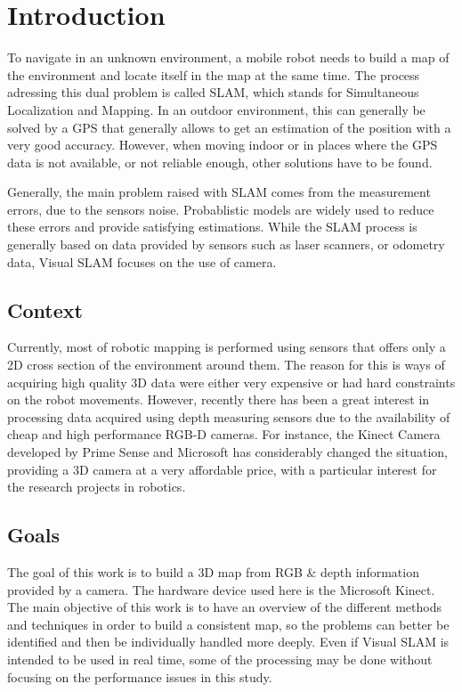 \chapter{Introduction}

To navigate in an unknown environment, a mobile robot needs to build a map of the environment and locate itself in the map at the same time. The process adressing this dual problem is called SLAM, which stands for Simultaneous Localization and Mapping. In an outdoor environment, this can generally be solved by a GPS that generally allows to get an estimation of the position with a very good accuracy. However, when moving indoor or in places where the GPS data is not available, or not reliable enough, other solutions have to be found. 

Generally, the main problem raised with SLAM comes from the measurement errors, due to the sensors noise. Probablistic models are widely used to reduce these errors and provide satisfying estimations. While the SLAM process is generally based on data provided by sensors such as laser scanners, or odometry data, Visual SLAM focuses on the use of camera. 

\section{Context}

Currently, most of robotic mapping is performed using sensors that offers only a 2D cross section of the environment around them. The reason for this is ways of acquiring high quality 3D data were either very expensive or had hard constraints on the robot movements. However, recently there has been a great interest in processing data acquired using depth measuring sensors due to the availability of cheap and high performance RGB-D cameras. For instance, the Kinect Camera developed by Prime Sense and Microsoft has considerably changed the situation, providing a 3D camera at a very affordable price, with a particular interest for the research projects in robotics.

\section{Goals}

The goal of this work is to build a 3D map from RGB \& depth information provided by a camera. The hardware device used here is the Microsoft Kinect. The main objective of this work is to have an overview of the different methods and techniques in order to build a consistent map, so the problems can better be identified and then be individually handled more deeply. Even if Visual SLAM is intended to be used in real time, some of the processing may be done without focusing on the performance issues in this study. 

